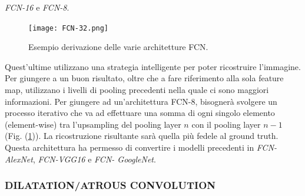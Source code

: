 \emph{FCN-16} e \emph{FCN-8}.
\begin{figure}
    \centering
    \texttt{[image: FCN-32.png]}
    \centering
    \caption{Esempio derivazione delle varie architetture FCN.}
    \label{FCN-models}
\end{figure}
Quest'ultime utilizzano una strategia intelligente per 
poter ricostruire l'immagine. Per giungere a un buon risultato, oltre che a 
fare riferimento alla sola feature map, utilizzano i livelli di pooling precedenti 
nella quale ci sono maggiori informazioni. Per giungere ad un'architettura 
FCN-8, bisognerà svolgere un processo iterativo che va ad effettuare una 
somma di ogni singolo elemento (element-wise) tra l'upsampling del pooling 
layer $n$ con il pooling layer $n-1$ (Fig. (\ref{FCN-models})). La ricostruzione risultante 
sarà quella più fedele al ground truth. Questa architettura ha permesso 
di convertire i modelli precedenti in \emph{FCN-AlexNet}, \emph{FCN-VGG16} e \emph{FCN-
GoogleNet}.

\subsubsection{DILATATION/ATROUS CONVOLUTION}
